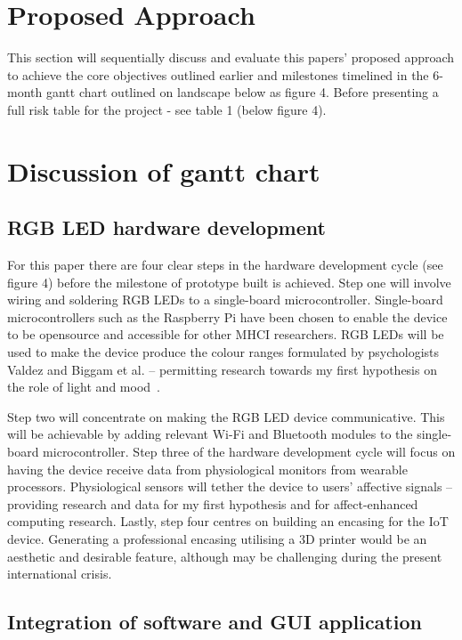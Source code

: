 \documentclass{sigchi}
\begin{document}
\section{Proposed Approach}

This section will sequentially discuss and evaluate this papers’ proposed approach to achieve the core objectives outlined earlier and milestones timelined in the 6-month gantt chart outlined on  landscape below as figure 4. Before presenting a full risk table for the project - see table 1 (below figure 4). 

\section{Discussion of gantt chart}
\subsection{RGB LED hardware development}

For this paper there are four clear steps in the hardware development cycle (see figure 4) before the milestone of prototype built is achieved. Step one will involve wiring and soldering RGB LEDs to a single-board microcontroller. Single-board microcontrollers such as the Raspberry Pi have been chosen to enable the device to be opensource and accessible for other MHCI researchers. RGB LEDs will be used to make the device produce the colour ranges formulated by psychologists Valdez and Biggam et al. – permitting research towards my first hypothesis on the role of light and mood~\cite{biggam2006progress, valdez1994effects}.

Step two will concentrate on making the RGB LED device communicative. This will be achievable by adding relevant Wi-Fi and Bluetooth modules to the single-board microcontroller. Step three of the hardware development cycle will focus on having the device receive data from physiological monitors from wearable processors. Physiological sensors will tether the device to users’ affective signals – providing research and data for my first hypothesis and for affect-enhanced computing research. Lastly, step four centres on building an encasing for the IoT device. Generating a professional encasing utilising a 3D printer would be an aesthetic and desirable feature, although may be challenging during the present international crisis.

\subsection{Integration of software and GUI application}
\end{document}
